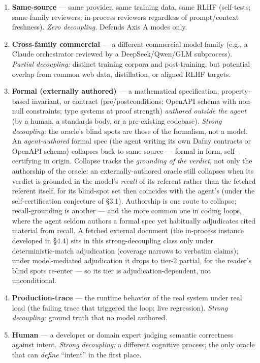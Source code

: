 \documentclass[
  11pt,
]{article}
\providecommand{\tightlist}{%
  \setlength{\itemsep}{0pt}\setlength{\parskip}{0pt}}
\begin{document}
\begin{enumerate}
\def\labelenumi{\arabic{enumi}.}
\tightlist
\item
  \textbf{Same-source} --- same provider, same training data, same RLHF
  (self-tests; same-family reviewers; in-process reviewers regardless of
  prompt/context freshness). \emph{Zero decoupling.} Defends Axis A
  modes only.
\item
  \textbf{Cross-family commercial} --- a different commercial model
  family (e.g., a Claude orchestrator reviewed by a DeepSeek/Qwen/GLM
  subprocess). \emph{Partial decoupling:} distinct training corpora and
  post-training, but potential overlap from common web data,
  distillation, or aligned RLHF targets.
\item
  \textbf{Formal (externally authored)} --- a mathematical
  specification, property-based invariant, or contract
  (pre/postconditions; OpenAPI schema with non-null constraints; type
  systems at proof strength) \emph{authored outside the agent} (by a
  human, a standards body, or a pre-existing codebase). \emph{Strong
  decoupling:} the oracle's blind spots are those of the formalism, not
  a model. An \emph{agent-authored} formal spec (the agent writing its
  own Dafny contracts or OpenAPI schema) collapses back to same-source
  --- formal in form, self-certifying in origin. Collapse tracks the
  \emph{grounding of the verdict}, not only the authorship of the
  oracle: an externally-authored oracle still collapses when its verdict
  is grounded in the model's \emph{recall} of its referent rather than
  the fetched referent itself, for its blind-spot set then coincides
  with the agent's (under the self-certification conjecture of §3.1).
  Authorship is one route to collapse; recall-grounding is another ---
  and the more common one in coding loops, where the agent seldom
  authors a formal spec yet habitually adjudicates cited material from
  recall. A fetched external document (the in-process instance developed
  in §4.4) sits in this strong-decoupling class only under
  deterministic-match adjudication (coverage narrows to verbatim
  claims); under model-mediated adjudication it drops to tier-2 partial,
  for the reader's blind spots re-enter --- so its tier is
  adjudication-dependent, not unconditional.
\item
  \textbf{Production-trace} --- the runtime behavior of the real system
  under real load (the failing trace that triggered the loop; live
  regression). \emph{Strong decoupling:} ground truth that no model
  authored.
\item
  \textbf{Human} --- a developer or domain expert judging semantic
  correctness against intent. \emph{Strong decoupling:} a different
  cognitive process; the only oracle that can \emph{define} ``intent''
  in the first place.
\end{enumerate}
\end{document}
